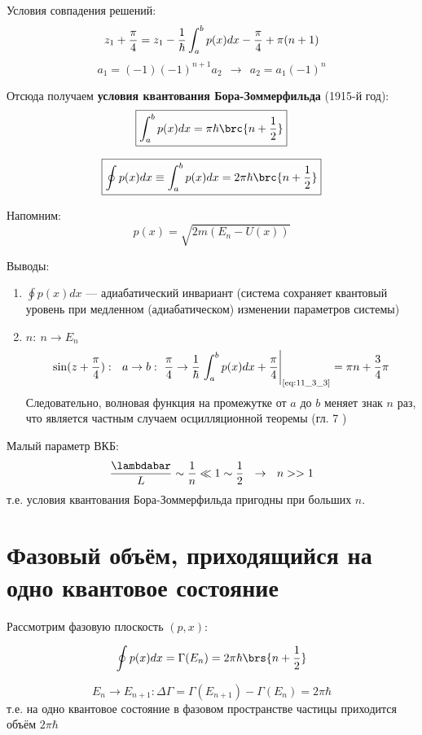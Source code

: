 Условия совпадения решений:
\begin{equation}
\label{eq:11_3_1}
z_1 + \frac{\pi}{4} = z_1 - \frac{1}{\hbar} \int_{a}^{b} p(x)dx - \frac{\pi}{4} + \pi(n+1) \\
\end{equation}
\begin{equation}
\label{eq:11_3_2}
a_1 = (-1)(-1)^{n+1}a_2  ~~\rightarrow~~ a_2 = a_1 (-1)^n
\end{equation}

Отсюда получаем \textbf{условия квантования Бора-Зоммерфильда} (1915-й год):
\begin{equation}
\label{eq:11_3_3}
\boxed{\int_{a}^{b} p(x)dx = \pi\hbar\brc{n+\frac{1}{2}}}
\end{equation}

\begin{equation}
\label{eq:11_3_4}
\boxed{\oint p(x)dx \equiv \int_{a}^{b} p(x)dx = 2\pi\hbar\brc{n+\frac{1}{2}}}
\end{equation}

Напомним:
$$
p(x) = \sqrt{2m(E_n - U(x))}
$$

Выводы:
\begin{enumerate}
\item $\oint p(x)dx $ --- адиабатический инвариант (система сохраняет квантовый уровень при медленном (адиабатическом) изменении параметров системы)
\item $n:~ n \to E_n$
$$
\sin({z+\frac{\pi}{4}}):~~ a \to b:~ \frac{\pi}{4} \to \frac{1}{\hbar} \left. \int_{a}^{b} p(x)dx + \frac{\pi}{4} \right|_{\text{\eqref{eq:11_3_3}}} =
\pi n + \frac{3}{4}\pi
$$
Следовательно, волновая функция на промежутке от $a$ до $b$ меняет знак $n$ раз, что является частным случаем осцилляционной теоремы (гл. 7 )
\end{enumerate}

Малый параметр ВКБ:
$$
\frac{\lambdabar}{L} \sim \frac{1}{n} \ll 1 \sim \frac{1}{2} ~~\rightarrow~~ n >> 1
$$
т.е. условия квантования Бора-Зоммерфильда пригодны при больших $n$.

\section{Фазовый объём, приходящийся на одно квантовое состояние}

Рассмотрим фазовую плоскость $(p,x)$:

$$
\oint p(x)dx = \Gamma(E_n) = 2\pi\hbar\brs{n+\frac{1}{2}}
$$

$$
E_n \to E_{n+1}: \boxed{\Delta\Gamma = \Gamma(E_{n+1}) - \Gamma(E_n) = 2\pi\hbar}
$$
т.е. на одно квантовое состояние в фазовом пространстве частицы приходится объём $2\pi\hbar$

